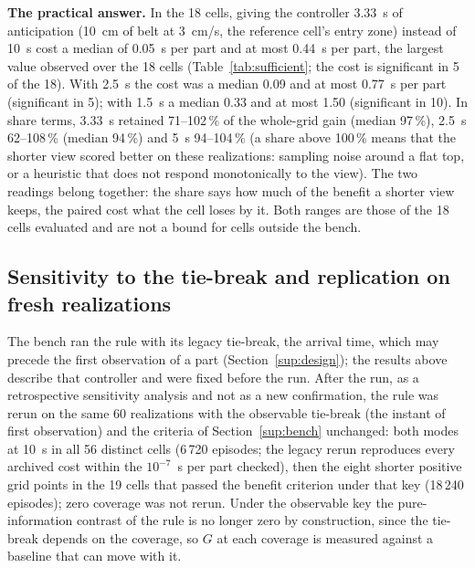 \documentclass[11pt,a4paper]{article}
\begin{document}
\textbf{The practical answer.} In the 18 cells, giving the controller 3.33~s of
anticipation (10~cm of belt at 3~cm/s, the reference cell's entry zone) instead of 10~s
cost a median of 0.05~s per part and at most 0.44~s per part, the largest value observed
over the 18 cells (Table~\ref{tab:sufficient}; the cost is significant in 5 of the 18).
With 2.5~s the cost was a median 0.09 and at most 0.77~s per part (significant in 5); with
1.5~s a median 0.33 and at most 1.50 (significant in 10). In share terms, 3.33~s retained
71--102\,\% of the whole-grid gain (median 97\,\%), 2.5~s 62--108\,\% (median 94\,\%) and
5~s 94--104\,\% (a share above 100\,\% means that the shorter view scored better on these
realizations: sampling noise around a flat top, or a heuristic that does not respond
monotonically to the view). The two
readings belong together: the share says how much of the benefit a shorter view keeps,
the paired cost what the cell loses by it. Both ranges are those of the 18 cells evaluated
and are not a bound for cells outside the bench.
\subsection{Sensitivity to the tie-break and replication on fresh realizations}\label{sup:tiebreak}
The bench ran the rule with its legacy tie-break, the arrival time, which may precede
the first observation of a part (Section~\ref{sup:design}); the results above describe
that controller and were fixed before the run. After the run, as a retrospective
sensitivity analysis and not as a new confirmation, the rule was rerun on the same 60
realizations with the observable tie-break (the instant of first observation) and the
criteria of Section~\ref{sup:bench} unchanged: both modes at 10~s in all 56 distinct cells
(6\,720 episodes; the legacy rerun reproduces every archived cost within the $10^{-7}$~s per
part checked), then the eight shorter positive grid points in the 19 cells that passed the
benefit criterion under that key (18\,240 episodes); zero coverage was not rerun. Under the
observable key the pure-information contrast of the rule is no longer zero by
construction, since the tie-break depends on the coverage, so $G$ at each coverage is
measured against a baseline that can move with it.
\end{document}
